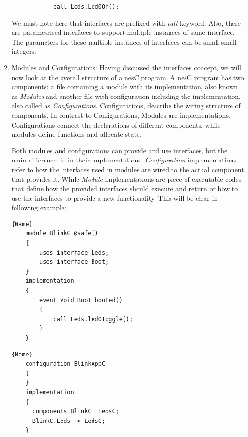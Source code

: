 \begin{enumerate}
        \begin{verbatim}
            call Leds.Led0On();
        \end{verbatim}
        
        We must note here that interfaces are prefixed with \textit{call} keyword. Also, there are parametrised interfaces to support multiple instances of same interface. The parameters for these multiple instances of interfaces can be small small integers.
        
        \item Modules and Configurations: Having discussed the interfaces concept, we will now look at the overall structure of a nesC program. A nesC program has two components: a file containing a module with its implementation, also known as \textit{Modules} and another file with configuration including the implementation, also called as \textit{Configurations}. Configurations, describe the wiring structure of components. In contrast to Configurations, Modules are implementations. Configurations connect the declarations  of  different  components,  while  modules  define  functions  and allocate state.
        
        Both modules and configurations can provide and use interfaces, but the main difference lie in their implementations. \textit{Configuration} implementations refer to how the interfaces used in modules are wired to the actual component that provides it. While \textit{Module} implementations are piece of executable codes that define how the provided interfaces should execute and return or how to use the interfaces to provide a new functionality. This will be clear in following example:
    
    \noindent\begin{minipage}{.40\textwidth}
    \begin{lstlisting}[title=Module,frame=tlrb]{Name}
    module BlinkC @safe()
    {
        uses interface Leds;
        uses interface Boot;
    }
    implementation
    {
        event void Boot.booted()
        {
            call Leds.led0Toggle();
        }
    }
    \end{lstlisting}
    \end{minipage}\hfill
    \begin{minipage}{.40\textwidth}
    \begin{lstlisting}[title=Configuration,frame=tlrb]{Name}
    configuration BlinkAppC
    {
    }
    implementation
    {
      components BlinkC, LedsC;
      BlinkC.Leds -> LedsC;
    }
    \end{lstlisting}
    \end{minipage}
    
    \end{enumerate}
    
